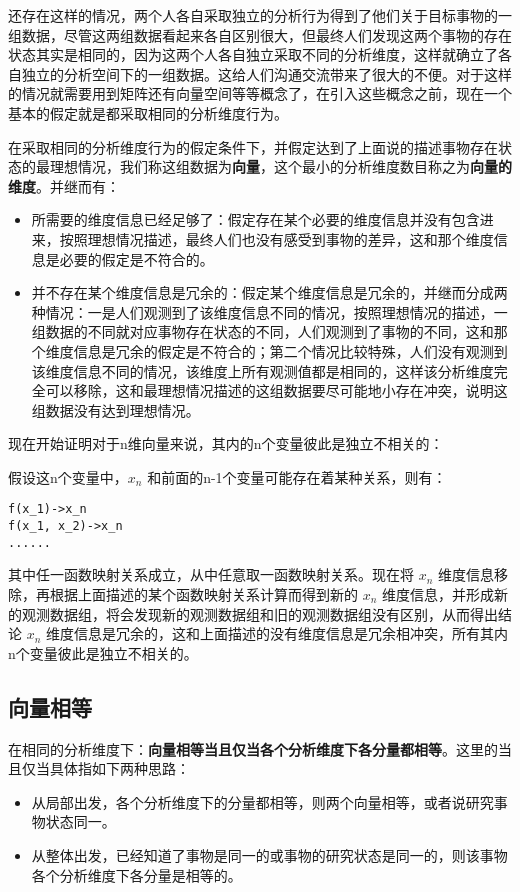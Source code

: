 \documentclass[12pt,oneside]{book}
\begin{document}
还存在这样的情况，两个人各自采取独立的分析行为得到了他们关于目标事物的一组数据，尽管这两组数据看起来各自区别很大，但最终人们发现这两个事物的存在状态其实是相同的，因为这两个人各自独立采取不同的分析维度，这样就确立了各自独立的分析空间下的一组数据。这给人们沟通交流带来了很大的不便。对于这样的情况就需要用到矩阵还有向量空间等等概念了，在引入这些概念之前，现在一个基本的假定就是都采取相同的分析维度行为。

在采取相同的分析维度行为的假定条件下，并假定达到了上面说的描述事物存在状态的最理想情况，我们称这组数据为\textbf{向量}，这个最小的分析维度数目称之为\textbf{向量的维度}。并继而有：

\begin{itemize}
\item 所需要的维度信息已经足够了：假定存在某个必要的维度信息并没有包含进来，按照理想情况描述，最终人们也没有感受到事物的差异，这和那个维度信息是必要的假定是不符合的。
\item 并不存在某个维度信息是冗余的：假定某个维度信息是冗余的，并继而分成两种情况：一是人们观测到了该维度信息不同的情况，按照理想情况的描述，一组数据的不同就对应事物存在状态的不同，人们观测到了事物的不同，这和那个维度信息是冗余的假定是不符合的；第二个情况比较特殊，人们没有观测到该维度信息不同的情况，该维度上所有观测值都是相同的，这样该分析维度完全可以移除，这和最理想情况描述的这组数据要尽可能地小存在冲突，说明这组数据没有达到理想情况。
\end{itemize}

现在开始证明对于n维向量来说，其内的n个变量彼此是独立不相关的：

假设这n个变量中，$x_n$ 和前面的n-1个变量可能存在着某种关系，则有：

\begin{Verbatim}
f(x_1)->x_n
f(x_1, x_2)->x_n
......
\end{Verbatim}

其中任一函数映射关系成立，从中任意取一函数映射关系。现在将 $x_n$ 维度信息移除，再根据上面描述的某个函数映射关系计算而得到新的 $x_n$ 维度信息，并形成新的观测数据组，将会发现新的观测数据组和旧的观测数据组没有区别，从而得出结论 $x_n$ 维度信息是冗余的，这和上面描述的没有维度信息是冗余相冲突，所有其内n个变量彼此是独立不相关的。

\subsection{向量相等}
在相同的分析维度下：\textbf{向量相等当且仅当各个分析维度下各分量都相等}。这里的当且仅当具体指如下两种思路：

\begin{itemize}
\item 从局部出发，各个分析维度下的分量都相等，则两个向量相等，或者说研究事物状态同一。
\item 从整体出发，已经知道了事物是同一的或事物的研究状态是同一的，则该事物各个分析维度下各分量是相等的。
\end{itemize}
\end{document}
